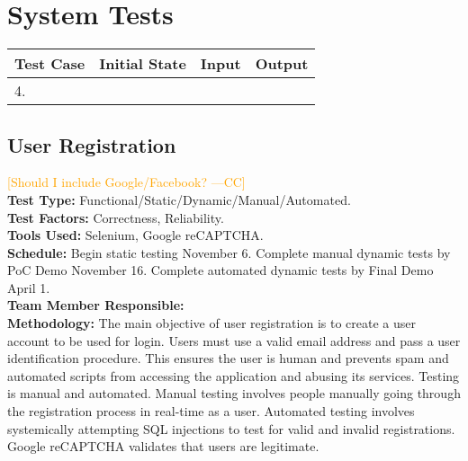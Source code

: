 \documentclass[12pt]{article}
\newcommand{\authornote}[3]{\textcolor{#1}{[#3 ---#2]}}
\newcommand{\authornote}[3]{}
\newcommand{\cc}[1]{\authornote{orange}{CC}{#1}}
\begin{document}
\section{System Tests}

\begin{longtable}{|p{2cm}|p{3cm}|p{5cm}|p{5cm}|}
\hline
\textbf{Test Case}  & \textbf{Initial State} & \textbf{Input} & \textbf{Output} \\ \hline
4. & & &  \\ 
\hline
\end{longtable}



\subsection{User Registration} \cc{Should I include Google/Facebook?}\\
\textbf{Test Type:} Functional/Static/Dynamic/Manual/Automated. \\
\textbf{Test Factors:} Correctness, Reliability. \\
\textbf{Tools Used:} Selenium, Google reCAPTCHA. \\
\textbf{Schedule:} Begin static testing November 6. Complete manual dynamic tests by PoC Demo November 16. Complete automated dynamic tests by Final Demo April 1. \\
\textbf{Team Member Responsible:} \\
\textbf{Methodology:} The main objective of user registration is to create a user account to be used for login. Users must use a valid email address and pass a user identification procedure. This ensures the user is human and prevents spam and automated scripts from accessing the application and abusing its services. Testing is manual and automated. Manual testing involves people manually going through the registration process in real-time as a user. Automated testing involves systemically attempting SQL injections to test for valid and invalid registrations. Google reCAPTCHA validates that users are legitimate.
\end{document}
